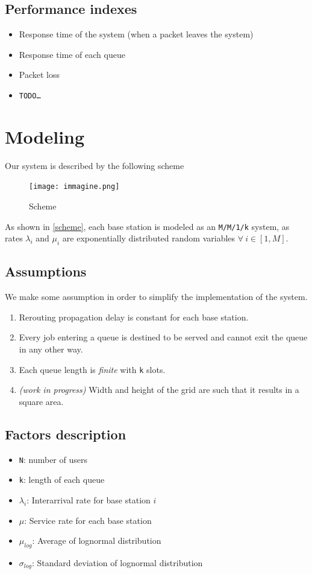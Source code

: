 \documentclass{report}
\begin{document}
\section{Performance indexes}
\begin{itemize}
    \item Response time of the system (when a packet leaves the system)
    \item Response time of each queue
    \item Packet loss
    \item \texttt{TODO\dots}
\end{itemize}

\chapter{Modeling}
Our system is described by the following scheme
\begin{figure}[H]
    \centering
    \texttt{[image: immagine.png]}
    \caption{Scheme}
    \label{scheme}
\end{figure}

As shown in \autoref{scheme}, each base station is modeled as an \texttt{M/M/1/k} system, as rates $\lambda_i$ and $\mu_i$ are exponentially distributed random variables $\forall \ i \in [1, M]$.

\section{Assumptions}
We make some assumption in order to simplify the implementation of the system.

\begin{enumerate}
    \item Rerouting propagation delay is constant for each base station.
    \item Every job entering a queue is destined to be served and cannot exit the queue in any other way.
    \item Each queue length is \textit{finite} with \texttt{k} slots.
    \item \textit{(work in progress)} Width and height of the grid are such that it results in a square area.
\end{enumerate}

\section{Factors description}\label{factors}
\begin{itemize}
    \item \texttt{N}: number of users
    \item \texttt{k}: length of each queue
    \item $\lambda_i$: Interarrival rate for base station $i$
    \item $\mu$: Service rate for each base station
    \item $\mu_{log}$: Average of lognormal distribution
    \item $\sigma_{log}$: Standard deviation of lognormal distribution
\end{itemize}
\end{document}
